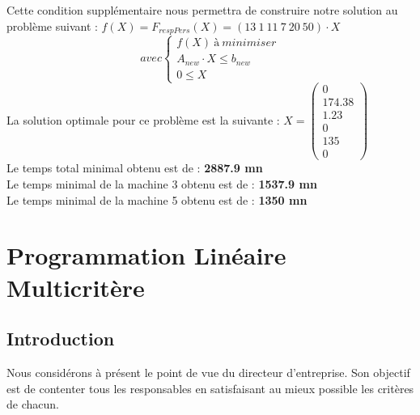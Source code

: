 \documentclass[a4paper, 11pt]{article}
\begin{document}
Cette condition supplémentaire nous permettra de construire notre solution au problème suivant :
$f(X) = F_{respPers} (X) =(13~1~11~7~20~50)\cdot X$ \\
$$
avec \left\{\begin{split}
	f(X)\ à\ minimiser\\
    A_{new}\cdot X \leq b_{new}\\
    0 \leq X
\end{split}\right.
$$
La solution optimale pour ce problème est la suivante :
$ X =\begin{pmatrix}
0\\
174.38\\
1.23\\
0\\
135\\
0
\end{pmatrix} $\\
Le temps total minimal obtenu est de : \textbf{2887.9 mn}\\
Le temps minimal de la machine 3 obtenu est de : \textbf{1537.9 mn}\\
Le temps minimal de la machine 5 obtenu est de : \textbf{1350 mn}
\newpage
\section{Programmation Linéaire Multicritère}
\subsection{Introduction}
Nous considérons à présent le point de vue du directeur d’entreprise. Son objectif est de contenter tous les responsables en satisfaisant au mieux possible les critères de chacun.
\end{document}
